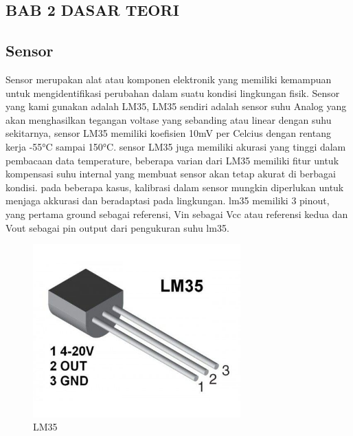 
\begin{center}
    \section*{BAB 2 DASAR TEORI}
\end{center}

\setcounter{section}{2}
\setcounter{subsection}{0}


\subsection{Sensor}
    Sensor merupakan alat atau komponen elektronik yang memiliki kemampuan untuk mengidentifikasi perubahan dalam suatu kondisi lingkungan fisik\cite{sensor}.
    Sensor yang kami gunakan adalah LM35, LM35 sendiri adalah sensor suhu Analog yang akan menghasilkan tegangan voltase yang sebanding atau linear dengan suhu sekitarnya, sensor LM35 memiliki koefisien 10mV per Celcius dengan rentang kerja -55°C sampai 150°C. sensor LM35 juga memiliki akurasi yang tinggi dalam pembacaan data temperature, beberapa varian dari LM35 memiliki fitur untuk kompensasi suhu internal yang membuat sensor akan tetap akurat di berbagai kondisi. pada beberapa kasus, kalibrasi dalam sensor mungkin diperlukan untuk menjaga akkurasi dan beradaptasi pada lingkungan. lm35 memiliki 3 pinout, yang pertama ground sebagai referensi, Vin sebagai Vcc atau referensi kedua dan Vout sebagai pin output dari pengukuran suhu lm35. 

    \begin{figure}[H]
        \centering
        \includegraphics[width=8cm]{image/lm35-suhu.jpg}
        \caption{LM35}
        \label{fig:lm35}
    \end{figure}

